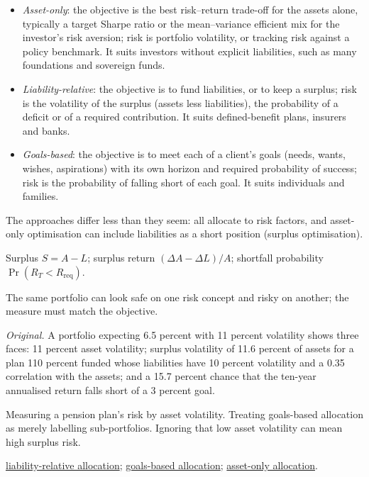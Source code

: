 \begin{qfdefinition}\label{def:allocation-approaches-risk}
 \citep[chap.~5, sec.~5, pp.~169--180]{portfolio-management-in-practice-v1-2020}
\begin{itemize}
\item \emph{Asset-only}: the objective is the best risk--return trade-off for the assets alone, typically a target Sharpe ratio or the mean--variance efficient mix for the investor's risk aversion; risk is portfolio volatility, or tracking risk against a policy benchmark. It suits investors without explicit liabilities, such as many foundations and sovereign funds.
\item \emph{Liability-relative}: the objective is to fund liabilities, or to keep a surplus; risk is the volatility of the surplus (assets less liabilities), the probability of a deficit or of a required contribution. It suits defined-benefit plans, insurers and banks.
\item \emph{Goals-based}: the objective is to meet each of a client's goals (needs, wants, wishes, aspirations) with its own horizon and required probability of success; risk is the probability of falling short of each goal. It suits individuals and families.
\end{itemize}
The approaches differ less than they seem: all allocate to risk factors, and asset-only optimisation can include liabilities as a short position (surplus optimisation).

 Surplus $S=A-L$; surplus return $(\Delta A-\Delta L)/A$; shortfall probability $\Pr(R_T<R_{\text{req}})$.

 The same portfolio can look safe on one risk concept and risky on another; the measure must match the objective.

 \emph{Original.} A portfolio expecting 6.5 percent with 11 percent volatility shows three faces: 11 percent asset volatility; surplus volatility of 11.6 percent of assets for a plan 110 percent funded whose liabilities have 10 percent volatility and a 0.35 correlation with the assets; and a 15.7 percent chance that the ten-year annualised return falls short of a 3 percent goal.

 Measuring a pension plan's risk by asset volatility. Treating goals-based allocation as merely labelling sub-portfolios. Ignoring that low asset volatility can mean high surplus risk.

 \hyperref[meth:liability-relative-allocation]{liability-relative allocation}; \hyperref[meth:goals-based-allocation-heuristics]{goals-based allocation}; \hyperref[meth:asset-only-allocation-mvo]{asset-only allocation}.

\end{qfdefinition}

